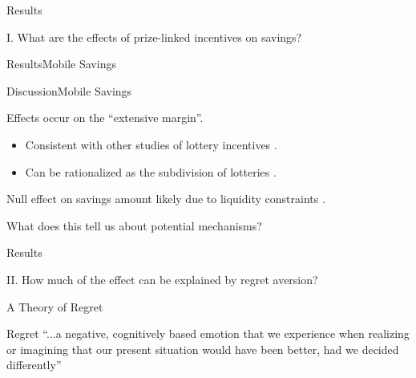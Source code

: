 \documentclass[aspectratio=169]{beamer}
\newenvironment{wideitemize}{\itemize\addtolength{\itemsep}{10pt}}{\enditemize}
\begin{document}
\begin{frame}{Results}
	
	\centering \large I. What are the effects of prize-linked incentives on savings?

\end{frame}

\begin{frame}{Results}{Mobile Savings}

	


\end{frame}

\begin{frame}{Discussion}{Mobile Savings}

	\begin{wideitemize}
		\item Effects occur on the ``extensive margin''.
		\begin{itemize}
			\item Consistent with other studies of lottery incentives \parencite{brune_effect_2015,gertler_long-term_2017}.
			\item Can be rationalized as the subdivision of lotteries \parencite{samuelson_risk_1963}.
		\end{itemize}
		\item Null effect on savings amount likely due to liquidity constraints \parencite{loibl_testing_2016}.
		\item What does this tell us about potential mechanisms?
	\end{wideitemize}

\end{frame}

\begin{frame}{Results}
	
	\centering \large II. How much of the effect can be explained by regret aversion?

\end{frame}

\begin{frame}{A Theory of Regret}

	\begin{block}{Regret \parencite{zeelenberg_consequences_2004}}
	 ``...a negative, cognitively based emotion that we experience when realizing or imagining that our present situation would have been better, had we decided differently''
	\end{block}

\end{frame}
\end{document}

